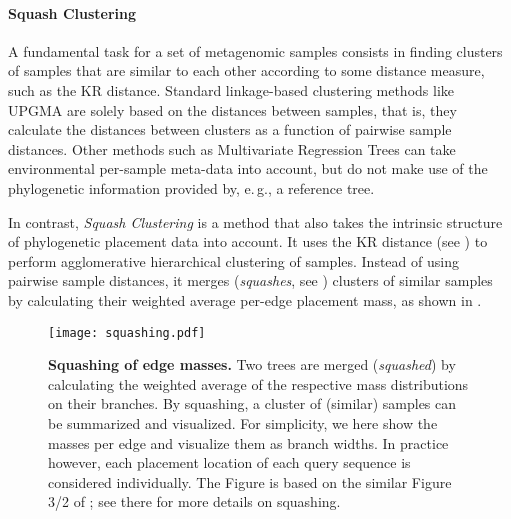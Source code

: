 \paragraph{Squash Clustering}
\label{ch:Foundations:sec:PhylogeneticPlacement:sub:ExistingMethods:par:SquashClustering}


A fundamental task for a set of metagenomic samples consists in
finding clusters of samples that are similar to each other according to some distance measure, such as the KR distance.
Standard linkage-based clustering methods like \mbox{UPGMA} %
are solely based on the distances between samples,
that is, they calculate the distances between clusters as a function of pairwise sample distances.
Other methods such as Multivariate Regression Trees \cite{Death2002} can take environmental per-sample meta-data
into account, but do not make use of the phylogenetic information provided by, e.\,g., a reference tree.

In contrast, \emph{Squash Clustering} \cite{Matsen2011a} is a method that
also takes the intrinsic structure of phylogenetic placement data into account.
It uses the KR distance (see )
to perform agglomerative hierarchical clustering of samples.
Instead of using pairwise sample distances, it merges
(\emph{squashes}, see )
clusters of similar samples by calculating their weighted average per-edge placement mass,
as shown in .

\begin{figure}[!htb]
    \centering
    \texttt{[image: squashing.pdf]}
    \caption[Squashing of edge masses]{
        \textbf{Squashing of edge masses.}
        Two trees are merged (\emph{squashed}) by calculating the weighted average
        of the respective mass distributions on their branches.
        By squashing, a cluster of (similar) samples can be summarized and visualized.
        For simplicity, we here show the masses per edge and visualize them as branch widths.
        In practice however, each placement location of each query sequence is considered individually.
        The Figure is based on the similar Figure 3/2 of ; see there for more details on squashing.
    }
    \label{fig:squashing}
\end{figure}

